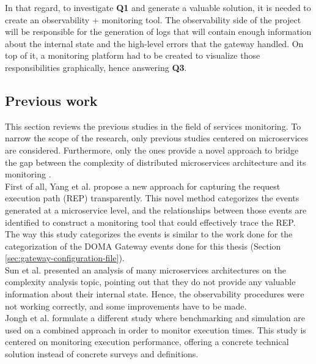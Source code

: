 \documentclass[english, 12pt, a4paper, sci, utf8, a-1b, online]{aaltothesis}
\begin{document}
In that regard, to investigate \textbf{Q1} and generate a valuable solution, it is needed to create an observability + monitoring tool. The observability side of the project will be responsible for the generation of logs that will contain enough information about the internal state and the high-level errors that the gateway handled. On top of it, a monitoring platform had to be created to visualize those responsibilities graphically, hence answering \textbf{Q3}.\\

\subsection{Previous work}

This section reviews the previous studies in the field of services monitoring. To narrow the scope of the research, only previous studies centered on microservices are considered. Furthermore, only the ones provide a novel approach to bridge the gap between the complexity of distributed microservices architecture and its monitoring \cite{niedermaier2019observability}.\\

First of all, Yang et al. \cite{yang2018transparently} propose a new approach for capturing the request execution path (REP) transparently. This novel method categorizes the events generated at a microservice level, and the relationships between those events are identified to construct a monitoring tool that could effectively trace the REP. The way this study categorizes the events is similar to the work done for the categorization of the DOMA Gateway events done for this thesis (Section \ref{sec:gateway-configuration-file}).\\

Sun et al. \cite{sun2018constraint} presented an analysis of many microservices architectures on the complexity analysis topic, pointing out that they do not provide any valuable information about their internal state. Hence, the observability procedures were not working correctly, and some improvements have to be made.\\

Jongh et al.\cite{johng2018estimating} formulate a different study where benchmarking and simulation are used on a combined approach in order to monitor execution times. This study is centered on monitoring execution performance, offering a concrete technical solution instead of concrete surveys and definitions.\\
\end{document}
